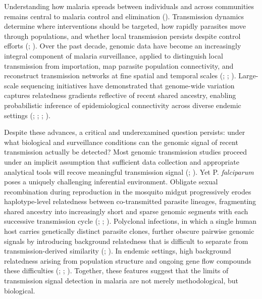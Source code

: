 \documentclass[
  11pt,
]{article}
\begin{document}
Understanding how malaria spreads between individuals and across
communities remains central to malaria control and elimination
(). Transmission
dynamics determine where interventions should be targeted, how rapidly
parasites move through populations, and whether local transmission
persists despite control efforts (; ). Over the past
decade, genomic data have become an increasingly integral component of
malaria surveillance, applied to distinguish local transmission from
importation, map parasite population connectivity, and reconstruct
transmission networks at fine spatial and temporal scales
(;
;
). Large-scale
sequencing initiatives have demonstrated that genome-wide variation
captures relatedness gradients reflective of recent shared ancestry,
enabling probabilistic inference of epidemiological connectivity across
diverse endemic settings (; ;
;
).

Despite these advances, a critical and underexamined question persists:
under what biological and surveillance conditions can the genomic signal
of recent transmission actually be detected? Most genomic transmission
studies proceed under an implicit assumption that sufficient data
collection and appropriate analytical tools will recove meaningful
transmission signal (;
). Yet P.
\emph{falciparum} poses a uniquely challenging inferential environment.
Obligate sexual recombination during reproduction in the mosquito midgut
progressively erodes haplotype-level relatedness between co-transmitted
parasite lineages, fragmenting shared ancestry into increasingly short
and sparse genomic segments with each successive transmission cycle
(;
;
). Polyclonal infections, in
which a single human host carries genetically distinct parasite clones,
further obscure pairwise genomic signals by introducing background
relatedness that is difficult to separate from transmission-derived
similarity (;
). In endemic settings,
high background relatedness arising from population structure and
ongoing gene flow compounds these difficulties
(;
;
). Together,
these features suggest that the limits of transmission signal detection
in malaria are not merely methodological, but biological.
\end{document}
